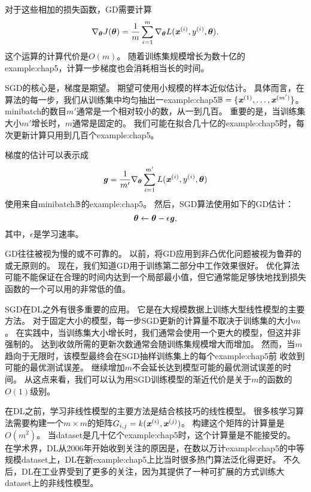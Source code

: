 对于这些相加的损失函数，\gls{GD}需要计算
\begin{equation}
    \nabla_{\boldsymbol{\theta}} J(\boldsymbol{\theta})
    = \frac{1}{m} \sum_{i=1}^m  
    \nabla_{\boldsymbol{\theta}} L(\boldsymbol{\mathit{x}}^{(i)}, y^{(i)}, \boldsymbol{\theta}) .
\end{equation}
这个运算的计算代价是$O(m)$。
随着训练集规模增长为数十亿的\gls{example:chap5}，计算一步梯度也会消耗相当长的时间。

\gls{SGD}的核心是，梯度是期望。
期望可使用小规模的样本近似估计。
具体而言，在算法的每一步，我们从训练集中均匀抽出一\gls{example:chap5}$\mathbb{B}=\{\boldsymbol{\mathit{x}}^{(1)},\dots,\boldsymbol{\mathit{x}}^{(m')}\}$。
\gls{minibatch}的数目$m'$通常是一个相对较小的数，从一到几百。
重要的是，当训练集大小$m'$增长时，$m$通常是固定的。
我们可能在拟合几十亿的\gls{example:chap5}时，每次更新计算只用到几百个\gls{example:chap5}。

梯度的估计可以表示成
\begin{equation}
    \boldsymbol{\mathit{g}} = \frac{1}{m'} \nabla_{\boldsymbol{\theta}} \sum_{i=1}^{m'}
    L(\boldsymbol{\mathit{x}}^{(i)}, y^{(i)}, \boldsymbol{\theta})
\end{equation}
使用来自\gls{minibatch}$\mathbb{B}$的\gls{example:chap5}。
然后，\gls{SGD}算法使用如下的\gls{GD}估计：
\begin{equation}
    \boldsymbol{\theta} \leftarrow \boldsymbol{\theta} - \epsilon \boldsymbol{\mathit{g}},
\end{equation}
其中，$\epsilon$是学习速率。

\gls{GD}往往被视为慢的或不可靠的。
以前，将\gls{GD}应用到非凸优化问题被视为鲁莽的或无原则的。
现在，我们知道\gls{GD}用于训练第二部分中工作效果很好。
优化算法可能不能保证在合理的时间内达到一个局部最小值，但它通常能足够快地找到损失函数的一个可以用的非常低的值。 


\gls{SGD}在\gls{DL}之外有很多重要的应用。
它是在大规模数据上训练大型线性模型的主要方法。
对于固定大小的模型，每一步\gls{SGD}更新的计算量不取决于训练集的大小$m$。
在实践中，当训练集大小增长时，我们通常会使用一个更大的模型，但这并非强制的。
达到收敛所需的更新次数通常会随训练集规模增大而增加。
然而，当$m$趋向于无限时，该模型最终会在\gls{SGD}抽样训练集上的每个\gls{example:chap5}前
收敛到可能的最优测试误差。
继续增加$m$不会延长达到模型可能的最优测试误差的时间。
从这点来看，我们可以认为用\gls{SGD}训练模型的渐近代价是关于$m$的函数的$O(1)$级别。

在\gls{DL}之前，学习非线性模型的主要方法是结合核技巧的线性模型。
很多核学习算法需要构建一个$m\times m$的矩阵$G_{i,j}=k(\boldsymbol{\mathit{x}}^{(i)}, \boldsymbol{\mathit{x}}^{(j)})$。
构建这个矩阵的计算量是$O(m^2)$。
当\gls{dataset}是几十亿个\gls{example:chap5}时，这个计算量是不能接受的。
在学术界，\gls{DL}从2006年开始收到关注的原因是，在数以万计\gls{example:chap5}的中等规模\gls{dataset}上，\gls{DL}在新\gls{example:chap5}上比当时很多热门算法泛化得更好。
不久后，\gls{DL}在工业界受到了更多的关注，因为其提供了一种可扩展的方式训练大\gls{dataset}上的非线性模型。


